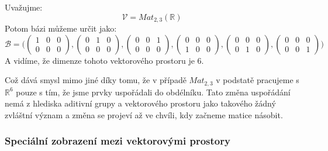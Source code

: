 \begin{example} Uvažujme:
    $$\mathcal{V} = Mat_{2,3}(\mathbb{R})$$
    Potom bázi můžeme určit jako:
    \[
        \mathcal{B} = \Bigg(
            \begin{pmatrix}
                1 & 0 & 0 \\
                0 & 0 & 0
            \end{pmatrix},
            \begin{pmatrix}
                0 & 1 & 0 \\
                0 & 0 & 0
            \end{pmatrix},
            \begin{pmatrix}
                0 & 0 & 1 \\
                0 & 0 & 0
            \end{pmatrix},
            \begin{pmatrix}
                0 & 0 & 0 \\
                1 & 0 & 0
            \end{pmatrix},
            \begin{pmatrix}
                0 & 0 & 0 \\
                0 & 1 & 0
            \end{pmatrix},
            \begin{pmatrix}
                0 & 0 & 0 \\
                0 & 0 & 1
            \end{pmatrix}
            \Bigg)
    \]
    A vidíme, že dimenze tohoto vektorového prostoru je 6.

    Což dává smysl mimo jiné díky tomu, že v případě $Mat_{2,3}$ v podstatě pracujeme s
    $\mathbb{R}^6$ pouze s tím, že jsme prvky uspořádali do obdélníku. Tato změna uspořádání
    nemá z hlediska aditivní grupy a vektorového prostoru jako takového žádný zvláštní
    význam a změna se projeví až ve chvíli, kdy začneme matice násobit.
\end{example}


\subsubsection{Speciální zobrazení mezi vektorovými prostory}

